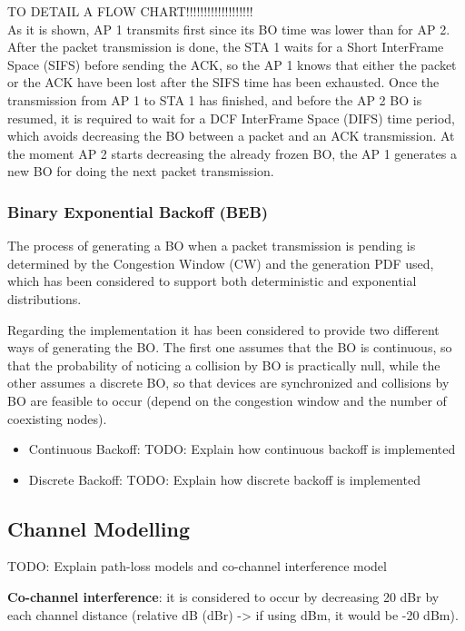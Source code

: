 \documentclass[a4paper]{article}
\begin{document}
TO DETAIL A FLOW CHART!!!!!!!!!!!!!!!!!!!\\

As it is shown, AP 1 transmits first since its BO time was lower than for AP 2. After the packet transmission is done, the STA 1 waits for a Short InterFrame Space (SIFS) before sending the ACK, so the AP 1 knows that either the packet or the ACK have been lost after the SIFS time has been exhausted. Once the transmission from AP 1 to STA 1 has finished, and before the AP 2 BO is resumed, it is required to wait for a DCF InterFrame Space (DIFS) time period, which avoids decreasing the BO between a packet and an ACK transmission. At the moment AP 2 starts decreasing the already frozen BO, the AP 1 generates a new BO for doing the next packet transmission.

\subsubsection{Binary Exponential Backoff (BEB)}
\label{section:beb}
The process of generating a BO when a packet transmission is pending is determined by the Congestion Window (CW) and the generation PDF used, which has been considered to support both deterministic and exponential distributions.

Regarding the implementation it has been considered to provide two different ways of generating the BO. The first one assumes that the BO is continuous, so that the probability of noticing a collision by BO is practically null, while the other assumes a discrete BO, so that devices are synchronized and collisions by BO are feasible to occur (depend on the congestion window and the number of coexisting nodes).

\begin{itemize}
\item Continuous Backoff: TODO: Explain how continuous backoff is implemented
\item Discrete Backoff: TODO: Explain how discrete backoff is implemented
\end{itemize}

\subsection{Channel Modelling}
TODO: Explain path-loss models and co-channel interference model

\textbf{Co-channel interference}: it is considered to occur by decreasing 20 dBr by each channel distance (relative dB (dBr) -> if using dBm, it would be -20 dBm).
\end{document}
